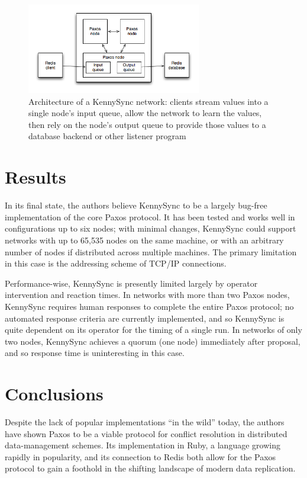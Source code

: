 \documentclass{acm_proc_article-sp}
\begin{document}
\begin{figure}
\centering
\includegraphics[width=3in]{arch.png}
\caption{Architecture of a KennySync network: clients stream values into a
single node's input queue, allow the network to learn the values, then rely on
the node's output queue to provide those values to a database backend or other
listener program}
\end{figure}

\section{Results}

In its final state, the authors believe KennySync to be a largely bug-free
implementation of the core Paxos protocol. It has been tested and works well in
configurations up to six nodes; with minimal changes, KennySync could support
networks with up to 65,535 nodes on the same machine, or with an arbitrary
number of nodes if distributed across multiple machines. The primary limitation
in this case is the addressing scheme of TCP/IP connections.

Performance-wise, KennySync is presently limited largely by operator
intervention and reaction times. In networks with more than two Paxos nodes,
KennySync requires human responses to complete the entire Paxos protocol; no
automated response criteria are currently implemented, and so KennySync is quite
dependent on its operator for the timing of a single run. In networks of only
two nodes, KennySync achieves a quorum (one node) immediately after proposal,
and so response time is uninteresting in this case.

\section{Conclusions}

Despite the lack of popular implementations ``in the wild'' today, the authors
have shown Paxos to be a viable protocol for conflict resolution in distributed
data-management schemes. Its implementation in Ruby, a language growing rapidly
in popularity, and its connection to Redis both allow for the Paxos protocol to
gain a foothold in the shifting landscape of modern data replication.
\end{document}
